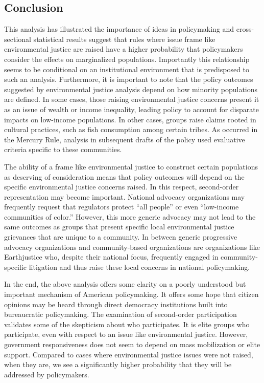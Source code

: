 \subsection{Conclusion}
This analysis has illustrated the importance of ideas in policymaking and cross-sectional statistical results suggest that rules where issue frame like environmental justice are raised have a higher probability that policymakers consider the effects on marginalized populations. Importantly this relationship seems to be conditional on an institutional environment that is predisposed to such an analysis. Furthermore, it is important to note that the policy outcomes suggested by environmental justice analysis depend on how minority populations are defined. In some cases, those raising environmental justice concerns present it as an issue of wealth or income inequality, leading policy to account for disparate impacts on low-income populations. In other cases, groups raise claims rooted in cultural practices, such as fish consumption among certain tribes. As occurred in the Mercury Rule, analysis in subsequent drafts of the policy used evaluative criteria specific to these communities. 

The ability of a frame like environmental justice to construct certain populations as deserving of consideration means that policy outcomes will depend on the specific environmental justice concerns raised. In this respect, second-order representation may become important. National  advocacy organizations may frequently request that regulators protect ``all people'' or even ``low-income communities of color.'' However, this more generic advocacy may not lead to the same outcomes as groups that present specific local environmental justice grievances that are unique to a community. In between generic progressive advocacy organizations and community-based organizations are organizations like Earthjustice who, despite their national focus, frequently engaged in community-specific litigation and thus raise these local concerns in national policymaking. 

In the end, the above analysis offers some clarity on a poorly understood but important mechanism of American policymaking. It offers some hope that citizen opinions may be heard through direct democracy institutions built into bureaucratic policymaking.  The examination of second-order participation validates some of the skepticism about who participates. It is elite groups who participate, even with respect to an issue like environmental justice. However, government responsiveness does not seem to depend on mass mobilization or elite support. Compared to cases where environmental justice issues were not raised, when they are, we see a significantly higher probability that they will be addressed by policymakers. 